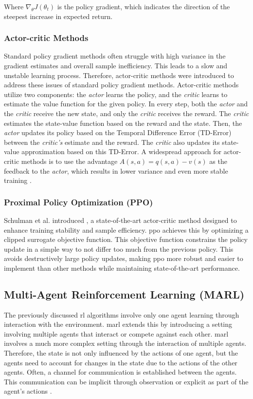 Where $\nabla_\theta J(\theta_t)$ is the policy gradient, which indicates the direction of the steepest increase in expected return.

\subsubsection{Actor-critic Methods}
Standard policy gradient methods often struggle with high variance in the gradient estimates and overall sample inefficiency.
This leads to a slow and unstable learning process.
Therefore, actor-critic methods were introduced to address these issues of standard policy gradient methods.
Actor-critic methods utilize two components: the \textit{actor} learns the policy, and the \textit{critic} learns to estimate the value function for the given policy.
In every step, both the \textit{actor} and the \textit{critic} receive the new state, and only the \textit{critic} receives the reward.
The \textit{critic} estimates the state-value function based on the reward and the state.
Then, the \textit{actor} updates its policy based on the Temporal Difference Error (TD-Error) between the \textit{critic's} estimate and the reward.
The \textit{critic} also updates its state-value approximation based on this TD-Error.
A widespread approach for actor-critic methods is to use the advantage $A(s, a)=q(s, a) - v(s)$ as the feedback to the \textit{actor}, which results in lower variance and even more stable training \cite{sewak_policy-approximation_2022}.

\subsubsection{Proximal Policy Optimization (PPO)}
Schulman et al. \cite{schulman_proximal_2017} introduced , a state-of-the-art actor-critic method designed to enhance training stability and sample efficiency.
\gls{ppo} achieves this by optimizing a clipped surrogate objective function.
This objective function constrains the policy update in a simple way to not differ too much from the previous policy.
This avoids destructively large policy updates, making \gls{ppo} more robust and easier to implement than other methods while maintaining state-of-the-art performance.

\subsection{Multi-Agent Reinforcement Learning (MARL)}
The previously discussed \gls{rl} algorithms involve only one agent learning through interaction with the environment.
\gls{marl} extends this by introducing a setting involving multiple agents that interact or compete against each other.
\gls{marl} involves a much more complex setting through the interaction of multiple agents.
Therefore, the state is not only influenced by the actions of one agent, but the agents need to account for changes in the state due to the actions of the other agents.
Often, a channel for communication is established between the agents.
This communication can be implicit through observation or explicit as part of the agent's actions \cite{busoniu_multi-agent_2008}.

